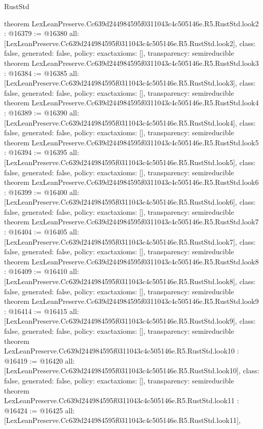 \begin{lexlean}{RustStd}
\begin{coremodule}
{}
theorem LexLeanPreserve.Cc639d244984595f0311043c4c505146e.R5.RustStd.look2 : @16379 := @16380 {
  all: [LexLeanPreserve.Cc639d244984595f0311043c4c505146e.R5.RustStd.look2],
  class: false,
  generated: false,
  policy: exact{axioms: []},
  transparency: semireducible
}
theorem LexLeanPreserve.Cc639d244984595f0311043c4c505146e.R5.RustStd.look3 : @16384 := @16385 {
  all: [LexLeanPreserve.Cc639d244984595f0311043c4c505146e.R5.RustStd.look3],
  class: false,
  generated: false,
  policy: exact{axioms: []},
  transparency: semireducible
}
theorem LexLeanPreserve.Cc639d244984595f0311043c4c505146e.R5.RustStd.look4 : @16389 := @16390 {
  all: [LexLeanPreserve.Cc639d244984595f0311043c4c505146e.R5.RustStd.look4],
  class: false,
  generated: false,
  policy: exact{axioms: []},
  transparency: semireducible
}
theorem LexLeanPreserve.Cc639d244984595f0311043c4c505146e.R5.RustStd.look5 : @16394 := @16395 {
  all: [LexLeanPreserve.Cc639d244984595f0311043c4c505146e.R5.RustStd.look5],
  class: false,
  generated: false,
  policy: exact{axioms: []},
  transparency: semireducible
}
theorem LexLeanPreserve.Cc639d244984595f0311043c4c505146e.R5.RustStd.look6 : @16399 := @16400 {
  all: [LexLeanPreserve.Cc639d244984595f0311043c4c505146e.R5.RustStd.look6],
  class: false,
  generated: false,
  policy: exact{axioms: []},
  transparency: semireducible
}
theorem LexLeanPreserve.Cc639d244984595f0311043c4c505146e.R5.RustStd.look7 : @16404 := @16405 {
  all: [LexLeanPreserve.Cc639d244984595f0311043c4c505146e.R5.RustStd.look7],
  class: false,
  generated: false,
  policy: exact{axioms: []},
  transparency: semireducible
}
theorem LexLeanPreserve.Cc639d244984595f0311043c4c505146e.R5.RustStd.look8 : @16409 := @16410 {
  all: [LexLeanPreserve.Cc639d244984595f0311043c4c505146e.R5.RustStd.look8],
  class: false,
  generated: false,
  policy: exact{axioms: []},
  transparency: semireducible
}
theorem LexLeanPreserve.Cc639d244984595f0311043c4c505146e.R5.RustStd.look9 : @16414 := @16415 {
  all: [LexLeanPreserve.Cc639d244984595f0311043c4c505146e.R5.RustStd.look9],
  class: false,
  generated: false,
  policy: exact{axioms: []},
  transparency: semireducible
}
theorem LexLeanPreserve.Cc639d244984595f0311043c4c505146e.R5.RustStd.look10 : @16419 := @16420 {
  all: [LexLeanPreserve.Cc639d244984595f0311043c4c505146e.R5.RustStd.look10],
  class: false,
  generated: false,
  policy: exact{axioms: []},
  transparency: semireducible
}
theorem LexLeanPreserve.Cc639d244984595f0311043c4c505146e.R5.RustStd.look11 : @16424 := @16425 {
  all: [LexLeanPreserve.Cc639d244984595f0311043c4c505146e.R5.RustStd.look11],
}
\end{coremodule}
\end{lexlean}

